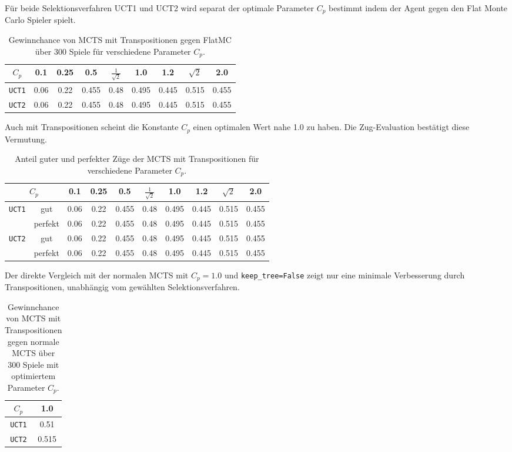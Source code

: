 Für beide Selektionsverfahren UCT1 und UCT2 wird separat der optimale Parameter $C_p$ bestimmt indem der Agent gegen den Flat Monte Carlo Spieler spielt.

\begin{table}[h!]
\centering
\begin{tabular}{ |c||c|c|c|c|c|c|c|c| }
 \hline
 $C_p$ & 0.1 & 0.25 & 0.5 & $\frac{1}{\sqrt{2}}$ & 1.0 & 1.2 & $\sqrt{2}$ & 2.0 \\
 \hline
 \verb|UCT1| & 0.06 & 0.22 & 0.455 & 0.48 & 0.495 & 0.445 & 0.515 & 0.455 \\
 \hline
 \verb|UCT2| & 0.06 & 0.22 & 0.455 & 0.48 & 0.495 & 0.445 & 0.515 & 0.455 \\
 \hline
\end{tabular}
\caption{Gewinnchance von MCTS mit Transpositionen gegen FlatMC über 300 Spiele für verschiedene Parameter $C_p$.}
\label{tab:transpos-flat-mc}
\end{table}

Auch mit Transpositionen scheint die Konstante $C_p$ einen optimalen Wert nahe 1.0 zu haben.
Die Zug-Evaluation bestätigt diese Vermutung.

\begin{table}[h!]
\centering
\begin{tabular}{ |c|c||c|c|c|c|c|c|c|c| }
 \hline
 \multicolumn{2}{|c|}{$C_p$} & 0.1 & 0.25 & 0.5 & $\frac{1}{\sqrt{2}}$ & 1.0 & 1.2 & $\sqrt{2}$ & 2.0 \\
 \hline
 \multirow{2}{*}{\texttt{UCT1}} & gut & 0.06 & 0.22 & 0.455 & 0.48 & 0.495 & 0.445 & 0.515 & 0.455 \\
  & perfekt & 0.06 & 0.22 & 0.455 & 0.48 & 0.495 & 0.445 & 0.515 & 0.455 \\
 \hline
 \multirow{2}{*}{\texttt{UCT2}} & gut & 0.06 & 0.22 & 0.455 & 0.48 & 0.495 & 0.445 & 0.515 & 0.455 \\
 & perfekt & 0.06 & 0.22 & 0.455 & 0.48 & 0.495 & 0.445 & 0.515 & 0.455 \\
 \hline
\end{tabular}
\caption{Anteil guter und perfekter Züge der MCTS mit Transpositionen für verschiedene Parameter $C_p$.}
\label{tab:transpos-move-eval}
\end{table}

Der direkte Vergleich mit der normalen MCTS mit $C_p=1.0$ und \verb|keep_tree=False| zeigt nur eine minimale Verbesserung durch Transpositionen, unabhängig vom gewählten Selektionsverfahren.

\begin{table}[h!]
\centering
\begin{tabular}{ |c||c| }
 \hline
 $C_p$ & 1.0 \\
 \hline
 \verb|UCT1| & 0.51  \\
 \hline
 \verb|UCT2| & 0.515 \\
 \hline
\end{tabular}
\caption{Gewinnchance von MCTS mit Transpositionen gegen normale MCTS über 300 Spiele mit optimiertem Parameter $C_p$.}
\label{tab:transpos-MCTS}
\end{table}

